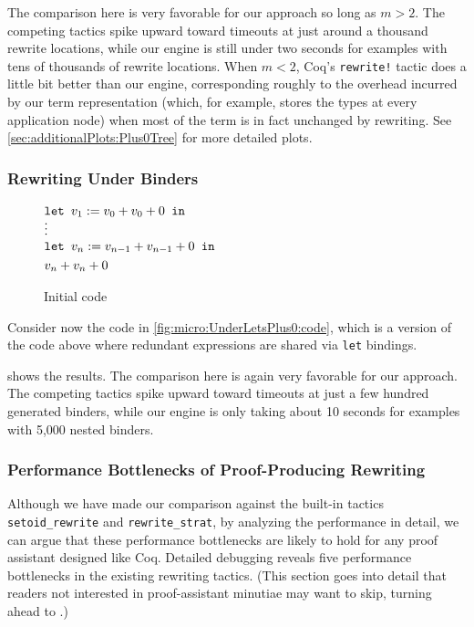 The comparison here is very favorable for our approach so long as $m > 2$.
The competing tactics spike upward toward timeouts at just around a thousand rewrite locations, while our engine is still under two seconds for examples with tens of thousands of rewrite locations.
When $m < 2$, Coq's \texttt{rewrite!} tactic does a little bit better than our engine, corresponding roughly to the overhead incurred by our term representation (which, for example, stores the types at every application node) when most of the term is in fact unchanged by rewriting.
See \autoref{sec:additionalPlots:Plus0Tree} for more detailed plots.

\subsubsection{Rewriting Under Binders}\label{sec:micro:UnderLetsPlus0}

\begin{figure}
{\small $\begin{aligned}
  & \letin[{v_1 := v_0 + v_0 + 0}{}] \\ \noalign{\vskip-7pt}
  & \vdots \\ \noalign{\vskip-3pt}
  & \letin[{v_n := v_{n-1} + v_{n-1} + 0}{}] \\
  & v_n + v_n + 0
\end{aligned}$}%
\caption{\label{fig:micro:UnderLetsPlus0:code}Initial code}
\end{figure}

Consider now the code in \autoref{fig:micro:UnderLetsPlus0:code}, which is a version of the code above where redundant expressions are shared via \texttt{let} bindings.

 shows the results.
The comparison here is again very favorable for our approach.
The competing tactics spike upward toward timeouts at just a few hundred generated binders, while our engine is only taking about 10 seconds for examples with 5,000 nested binders.

\subsubsection{Performance Bottlenecks of Proof-Producing Rewriting}\label{sec:micro:setoid-rewrite-bottlenecks-lite}\label{sec:setoid-rewrite-bottlenecks}

Although we have made our comparison against the built-in tactics \texttt{setoid_rewrite} and \texttt{rewrite_strat}, by analyzing the performance in detail, we can argue that these performance bottlenecks are likely to hold for any proof assistant designed like Coq.
Detailed debugging reveals five performance bottlenecks in the existing rewriting tactics.
(This section goes into detail that readers not interested in proof-assistant minutiae may want to skip, turning ahead to  .)

